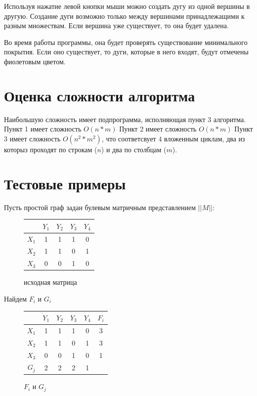 \documentclass[12pt]{article}
\begin{document}
Используя нажатие левой кнопки мыши можно создать дугу из
одной вершины в другую. Создание дуги возможно только между вершинами
принадлежащими к разным множествам. Если вершина уже существует, то
она будет удалена.

Во время работы программы, она будет проверять существование
минимального покрытия. Если оно существует, то дуги, которые в него входят,
будут отмечены фиолетовым цветом.

\section{Оценка сложности алгоритма}

Наибольшую сложность имеет подпрограмма, исполняющая
пункт 3 алгоритма. Пункт 1 имеет сложность $O(n * m)$
Пункт 2 имеет сложность $O(n * m)$
Пункт 3 имеет сложность $O(n^2 * m^2)$, что соответсвует $4$
вложенным циклам, два из которыз проходят по строкам ($n$) и
два по столбцам ($m$).

\section{Тестовые примеры}

Пусть простой граф задан булевым матричным представлением $||M||$:

\begin{figure}[H]
    \centering
    \begin{tabular}{ c|c|c|c|c| }
              & $Y_1$ & $Y_2$ & $Y_3$ & $Y_4$ \\
        \hline
        $X_1$ & 1     & 1     & 1     & 0     \\
        \hline
        $X_2$ & 1     & 1     & 0     & 1     \\
        \hline
        $X_3$ & 0     & 0     & 1     & 0     \\
        \hline
    \end{tabular}
    \label{fig:table1}
    \caption{исходная матрица}
\end{figure}

Найдем $F_i$ и $G_i$

\begin{figure}[H]
    \centering
    \begin{tabular}{ c|c|c|c|c|c }
              & $Y_1$ & $Y_2$ & $Y_3$ & $Y_4$ & $F_i$ \\
        \hline
        $X_1$ & 1     & 1     & 1     & 0     & 3     \\
        \hline
        $X_2$ & 1     & 1     & 0     & 1     & 3     \\
        \hline
        $X_3$ & 0     & 0     & 1     & 0     & 1     \\
        \hline
        $G_j$ & 2     & 2     & 2     & 1     &
    \end{tabular}
    \label{fig:FiGj}
    \caption{$F_i$ и $G_j$}
\end{figure}
\end{document}
